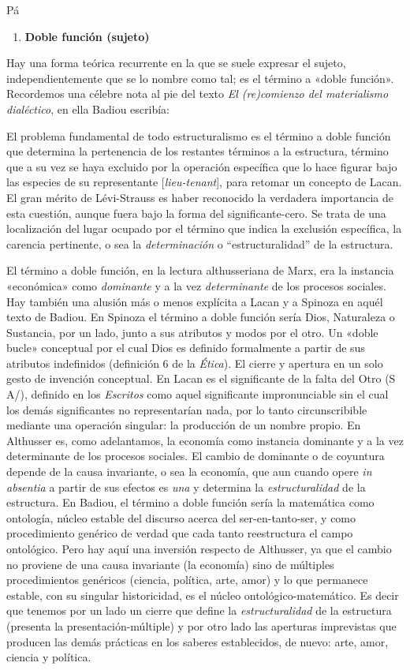 Pá

\begin{enumerate}
\def\labelenumi{\arabic{enumi}.}
\item
  \textbf{Doble función (sujeto)}
\end{enumerate}

Hay una forma teórica recurrente en la que se suele expresar el sujeto, independientemente que se lo nombre como tal; es el término a «doble función». Recordemos una célebre nota al pie del texto \emph{El (re)comienzo del materialismo dialéctico}, en ella Badiou escribía:

El problema fundamental de todo estructuralismo es el término a doble función que determina la pertenencia de los restantes términos a la estructura, término que a su vez se haya excluido por la operación específica que lo hace figurar bajo las especies de su representante {[}\emph{lieu-tenant}{]}, para retomar un concepto de Lacan. El gran mérito de Lévi-Strauss es haber reconocido la verdadera importancia de esta cuestión, aunque fuera bajo la forma del significante-cero. Se trata de una localización del lugar ocupado por el término que indica la exclusión específica, la carencia pertinente, o sea la \emph{determinación} o ``estructuralidad'' de la estructura.

El término a doble función, en la lectura althusseriana de Marx, era la instancia «económica» como \emph{dominante} y a la vez \emph{determinante} de los procesos sociales. Hay también una alusión más o menos explícita a Lacan y a Spinoza en aquél texto de Badiou. En Spinoza el término a doble función sería Dios, Naturaleza o Sustancia, por un lado, junto a sus atributos y modos por el otro. Un «doble bucle» conceptual por el cual Dios es definido formalmente a partir de sus atributos indefinidos (definición 6 de la \emph{Ética}). El cierre y apertura en un solo gesto de invención conceptual. En Lacan es el significante de la falta del Otro (S A/), definido en los \emph{Escritos} como aquel significante impronunciable sin el cual los demás significantes no representarían nada, por lo tanto circunscribible mediante una operación singular: la producción de un nombre propio. En Althusser es, como adelantamos, la economía como instancia dominante y a la vez determinante de los procesos sociales. El cambio de dominante o de coyuntura depende de la causa invariante, o sea la economía, que aun cuando opere \emph{in absentia} a partir de sus efectos es \emph{una} y determina la \emph{estructuralidad} de la estructura. En Badiou, el término a doble función sería la matemática como ontología, núcleo estable del discurso acerca del ser-en-tanto-ser, y como procedimiento genérico de verdad que cada tanto reestructura el campo ontológico. Pero hay aquí una inversión respecto de Althusser, ya que el cambio no proviene de una causa invariante (la economía) sino de múltiples procedimientos genéricos (ciencia, política, arte, amor) y lo que permanece estable, con su singular historicidad, es el núcleo ontológico-matemático. Es decir que tenemos por un lado un cierre que define la \emph{estructuralidad} de la estructura (presenta la presentación-múltiple) y por otro lado las aperturas imprevistas que producen las demás prácticas en los saberes establecidos, de nuevo: arte, amor, ciencia y política.

